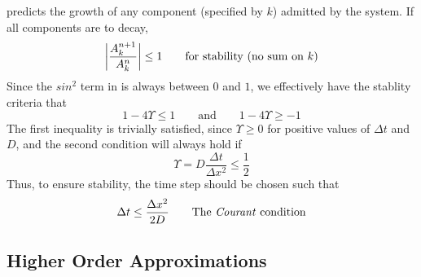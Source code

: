  predicts the growth of any component (specified by $k$)
admitted by the system. If all components are to decay,
\begin{equation}
  \left| \dfrac{A_k^{n+1}}{A_k^n} \right| \leq 1 \qquad \text{for stability (no sum on $k$)}
\end{equation}
Since the $sin^2$ term in  is always between $0$ and $1$,
we effectively have the stablity criteria that
\begin{equation}
  1 - 4 \Upsilon \leq 1 \qquad \text{and} \qquad 1 - 4 \Upsilon \geq -1
\end{equation}
The first inequality is trivially satisfied, since $\Upsilon \geq 0$ for
positive values of $\Delta t$ and $D$, and the second condition will always
hold if
\begin{equation}
   \Upsilon = D\dfrac{\Delta t}{\Delta x^2} \leq \dfrac{1}{2}
\end{equation}
Thus, to ensure stability, the time step should be chosen such that
\begin{equation}
   \Delta t \leq \dfrac{\Delta x^2}{2D} \qquad \text{The \emph{Courant}
   condition}
\end{equation}


\subsection{Higher Order Approximations}

